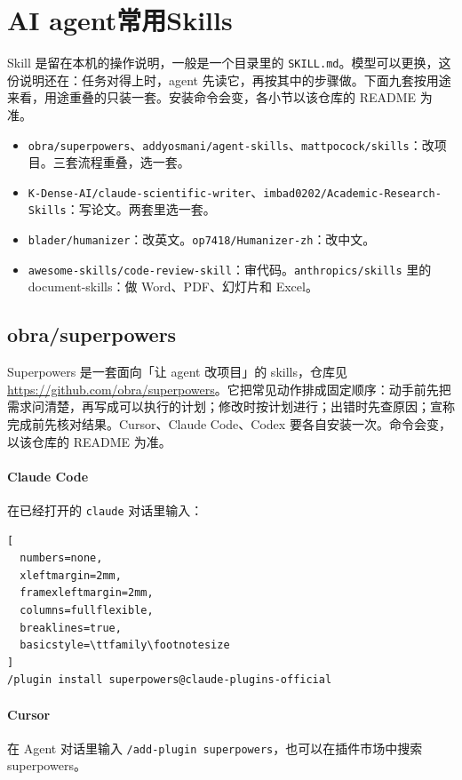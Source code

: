 \section{AI agent常用Skills}
Skill 是留在本机的操作说明，一般是一个目录里的 \verb|SKILL.md|。模型可以更换，这份说明还在：任务对得上时，agent 先读它，再按其中的步骤做。下面九套按用途来看，用途重叠的只装一套。安装命令会变，各小节以该仓库的 README 为准。

\begin{itemize}
\item \verb|obra/superpowers|、\verb|addyosmani/agent-skills|、\verb|mattpocock/skills|：改项目。三套流程重叠，选一套。
\item \verb|K-Dense-AI/claude-scientific-writer|、\verb|imbad0202/Academic-Research-Skills|：写论文。两套里选一套。
\item \verb|blader/humanizer|：改英文。\verb|op7418/Humanizer-zh|：改中文。
\item \verb|awesome-skills/code-review-skill|：审代码。\verb|anthropics/skills| 里的 document-skills：做 Word、PDF、幻灯片和 Excel。
\end{itemize}

\subsection{obra/superpowers}
Superpowers 是一套面向「让 agent 改项目」的 skills，仓库见 \url{https://github.com/obra/superpowers}。它把常见动作排成固定顺序：动手前先把需求问清楚，再写成可以执行的计划；修改时按计划进行；出错时先查原因；宣称完成前先核对结果。Cursor、Claude Code、Codex 要各自安装一次。命令会变，以该仓库的 README 为准。

\paragraph{Claude Code}
在已经打开的 \verb|claude| 对话里输入：
\begin{lstlisting}[
  numbers=none,
  xleftmargin=2mm,
  framexleftmargin=2mm,
  columns=fullflexible,
  breaklines=true,
  basicstyle=\ttfamily\footnotesize
]
/plugin install superpowers@claude-plugins-official
\end{lstlisting}

\paragraph{Cursor}
在 Agent 对话里输入 \verb|/add-plugin superpowers|，也可以在插件市场中搜索 superpowers。

